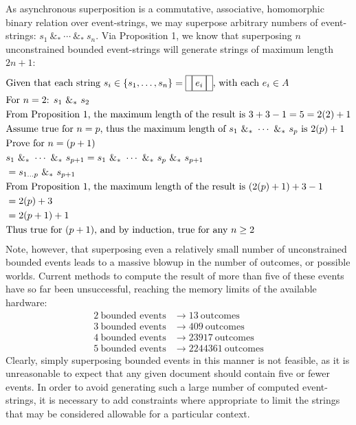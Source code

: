 \documentclass[a4paper,11pt]{article}
\newcommand{\vph}[1]{\vphantom{#1}}
\newcommand{\ebox}[1]{\fbox{$\vph{',}#1$}}
\begin{document}
As asynchronous superposition is a commutative, associative, homomorphic binary 
relation over event-strings, we may superpose 
arbitrary numbers of event-strings: $s_1 ~\&_*~ \cdots ~\&_*~ s_n$. Via 
Proposition 1, we know that superposing $n$ unconstrained bounded event-strings 
will generate strings of maximum length $2n + 1$:
\begin{align*}
&\mbox{Given that each string } s_i \in \{ s_1, \ldots, s_n \} = 
\ebox{}\ebox{e_i}\ebox{}\mbox{, with each }e_i \in A\\
&\mbox{For } n = 2\mbox{: }s_1~\&_*~s_2\\
&\mbox{From Proposition 1, the maximum length 
of the result is } 3 + 3 - 1 = 5 = 2(2) + 1\\
&\mbox{Assume true for }n = p\mbox{, thus the maximum length of }s_1 ~\&_*~ 
\cdots ~\&_*~ s_p\mbox{ is }2(p) + 1\\
&\mbox{Prove for }n = (p + 1)\\
&s_1 ~\&_*~ \cdots ~\&_*~ s_{p+1} = s_1 ~\&_*~ \cdots ~\&_*~ s_p~\&_*~ 
s_{p+1}\\
&= s_{1 \ldots p}~\&_*~s_{p+1}\\
&\mbox{From Proposition 1, the maximum length of the result is }(2(p) + 1) + 3 
- 1\\
&=2(p) + 3\\
&=2(p + 1) + 1\\
&\mbox{Thus true for }(p+1)\mbox{, and by induction, true for any }n \geq 2
\end{align*}
Note, however, that superposing even a relatively small number of 
unconstrained bounded events leads to a massive blowup in the 
number of outcomes, or possible worlds. Current methods to compute the result 
of more than five of these events have so far been unsuccessful, reaching the 
memory 
limits of the available hardware:
\begin{align*}
2 ~\mbox{bounded events} &\to 13 ~\mbox{outcomes}\\
3 ~\mbox{bounded events} &\to 409 ~\mbox{outcomes}\\
4 ~\mbox{bounded events} &\to 23917 ~\mbox{outcomes}\\
5 ~\mbox{bounded events} &\to 2244361 ~\mbox{outcomes}
\end{align*}
Clearly, simply superposing bounded events in this manner is not feasible, as 
it 
is unreasonable to expect that any given document should contain five or fewer 
events. In order to avoid generating such a large number of computed 
event-strings, it is necessary to add constraints where appropriate to limit the
strings that may be considered allowable for a particular context.
\end{document}
